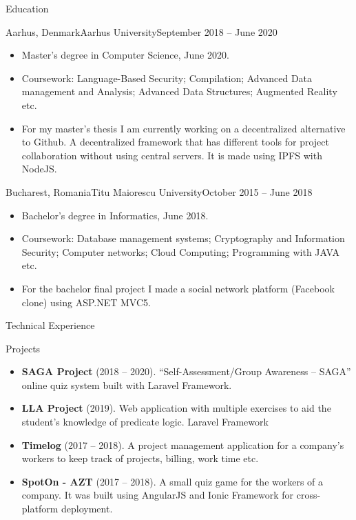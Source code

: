 \documentclass{mcdowellcv}
\begin{document}
	\begin{cvsection}{Education}
		\begin{cvsubsection}{Aarhus, Denmark}{Aarhus University}{September 2018 -- June 2020}
			\begin{itemize}
				\item Master's degree in Computer Science, June 2020.
				\item Coursework:  Language-Based Security; Compilation;  Advanced Data management and Analysis;  Advanced Data Structures; Augmented Reality etc.
				\item For my master's thesis I am currently working on a decentralized alternative to Github. A decentralized framework that has different tools for project collaboration without using central servers. It is made using IPFS with NodeJS. 
			\end{itemize}
		\end{cvsubsection}
		
		\begin{cvsubsection}{Bucharest, Romania}{Titu Maiorescu University}{October 2015 -- June 2018}
			\begin{itemize}
				\item Bachelor's degree in Informatics, June 2018.
				\item Coursework:  Database management systems; Cryptography and Information Security;  Computer networks;  Cloud Computing; Programming with JAVA etc.
				\item For the bachelor final project I made a social network platform (Facebook clone) using ASP.NET MVC5.
			\end{itemize}
		\end{cvsubsection}
	\end{cvsection}
	
	\begin{cvsection}{Technical Experience}
		\begin{cvsubsection}{Projects}{}{}
			\begin{itemize}
				\item \textbf{SAGA Project} (2018 – 2020). “Self-Assessment/Group Awareness – SAGA” online quiz system built with Laravel Framework. 
				\item \textbf{LLA Project} (2019). Web application with multiple exercises to aid the student's knowledge of predicate logic.  Laravel Framework
				\item \textbf{Timelog} (2017 -- 2018).  A project management application for a company's workers to keep track of projects, billing, work time etc. 
				\item \textbf{SpotOn - AZT} (2017 -- 2018).  A small quiz game for the workers of a company. It was built using AngularJS and Ionic Framework for cross-platform deployment.
			\end{itemize}
		\end{cvsubsection}
	\end{cvsection}
\end{document}

